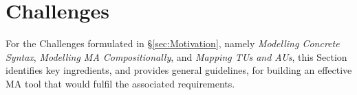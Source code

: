 \section{Challenges}
\label{sec:Challenges}

For the Challenges formulated in \S \ref{sec:Motivation}, namely 
\emph{Modelling Concrete Syntax}, \emph{Modelling MA Compositionally}, and 
\emph{Mapping TUs and AUs}, this Section identifies key ingredients, and provides
general guidelines, for building an effective MA tool that would fulfil the 
associated requirements.





 